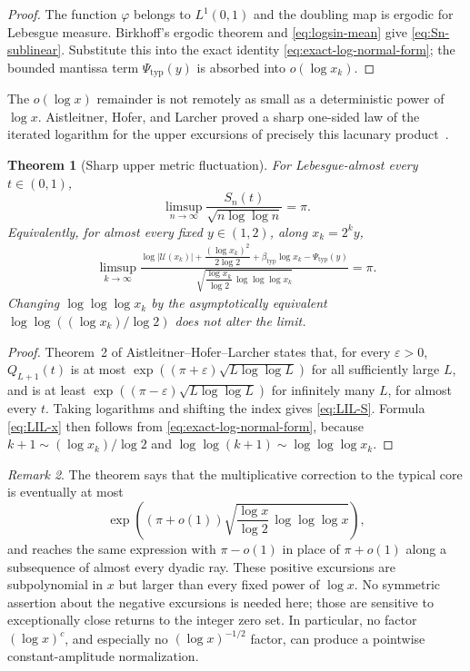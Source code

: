 \documentclass[11pt,oneside]{article}
\newtheorem{theorem}{Theorem}[section]
\theoremstyle{definition}
\theoremstyle{remark}
\newtheorem{remark}[theorem]{Remark}
\newcommand{\Uhat}{\mathcal U}
\begin{document}
\begin{proof}
The function $\varphi$ belongs to $L^1(0,1)$ and the doubling map is ergodic for
Lebesgue measure.  Birkhoff's ergodic theorem and \eqref{eq:logsin-mean} give
\eqref{eq:Sn-sublinear}.  Substitute this into the exact identity
\eqref{eq:exact-log-normal-form}; the bounded mantissa term
$\Psi_{\mathrm{typ}}(y)$ is absorbed into $o(\log x_k)$.
\end{proof}

The $o(\log x)$ remainder is not remotely as small as a deterministic power of
$\log x$.  Aistleitner, Hofer, and Larcher proved a sharp one-sided law of the
iterated logarithm for the upper excursions of precisely this lacunary
product~\cite{ahl2017}.

\begin{theorem}[Sharp upper metric fluctuation]\label{thm:lil}
For Lebesgue-almost every $t\in(0,1)$,
\begin{equation}\label{eq:LIL-S}
 \limsup_{n\to\infty}
 \frac{S_n(t)}{\sqrt{n\log\log n}}=\pi.
\end{equation}
Equivalently, for almost every fixed $y\in(1,2)$, along $x_k=2^ky$,
\begin{multline}\label{eq:LIL-x}
 \limsup_{k\to\infty}
 \frac{
 \log|\Uhat(x_k)|
 +\dfrac{(\log x_k)^2}{2\log2}
 +\beta_{\mathrm{typ}}\log x_k
 -\Psi_{\mathrm{typ}}(y)
 }
 {\sqrt{\dfrac{\log x_k}{\log2}\,
 \log\log\log x_k}}
 =\pi.
\end{multline}
Changing $\log\log\log x_k$ by the asymptotically equivalent
$\log\log((\log x_k)/\log2)$ does not alter the limit.
\end{theorem}

\begin{proof}
Theorem~2 of Aistleitner--Hofer--Larcher states that, for every $\varepsilon>0$,
$Q_{L+1}(t)$ is at most
$\exp((\pi+\varepsilon)\sqrt{L\log\log L})$ for all sufficiently large $L$, and is
at least $\exp((\pi-\varepsilon)\sqrt{L\log\log L})$ for infinitely many $L$,
for almost every $t$.  Taking logarithms and shifting the index gives
\eqref{eq:LIL-S}.  Formula \eqref{eq:LIL-x} then follows from
\eqref{eq:exact-log-normal-form}, because $k+1\sim(\log x_k)/\log2$ and
$\log\log(k+1)\sim\log\log\log x_k$.
\end{proof}

\begin{remark}
The theorem says that the multiplicative correction to the typical core is eventually
at most
\[
 \exp\!\left((\pi+o(1))
 \sqrt{\frac{\log x}{\log2}\,\log\log\log x}\right),
\]
and reaches the same expression with $\pi-o(1)$ in place of $\pi+o(1)$ along a
subsequence of almost every dyadic ray.  These positive excursions are subpolynomial in
$x$ but larger than every fixed power of $\log x$.  No symmetric assertion about the
negative excursions is needed here; those are sensitive to exceptionally close returns to
the integer zero set.  In particular, no factor $(\log x)^c$, and especially no
$(\log x)^{-1/2}$ factor, can produce a pointwise constant-amplitude normalization.
\end{remark}
\end{document}
